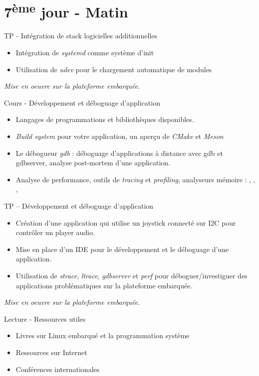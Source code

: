 \documentclass[a4paper,12pt,obeyspaces,spaces,hyphens]{article}
\begin{document}
\section{7\textsuperscript{ème} jour - Matin}

\feagendaonecolumn
{TP - Intégration de stack logicielles additionnelles}
{
  \begin{itemize}
  \item Intégration de {\em systemd} comme système d'init
  \item Utilisation de {\em udev} pour le chargement automatique de
    modules
  \end{itemize}

  \vspace{0.5cm}
  {\em Mise en oeuvre sur la plateforme embarquée.}
}

\feagendaonecolumn
{Cours - Développement et déboguage d'application}
{
  \begin{itemize}
  \item Langages de programmations et bibliothèques disponibles.
  \item {\em Build system} pour votre application, un aperçu de {\em
      CMake} et {\em Meson}
  \item Le débogueur {\em gdb} : déboguage d'applications à distance
    avec gdb et gdbserver, analyse post-mortem d'une application.
  \item Analyse de performance, outils de {\em tracing} et {\em
      profiling}, analyseurs mémoire : , ,
    , 
  \end{itemize}
}

\feagendaonecolumn
{TP – Développement et déboguage d'application}
{
  \begin{itemize}
  \item Création d'une application qui utilise un joystick connecté
    sur I2C pour contrôler un player audio.
  \item Mise en place d'un IDE pour le développement et le déboguage
    d'une application.
  \item Utilisation de {\em strace}, {\em ltrace}, {\em gdbserver} et
    {\em perf} pour déboguer/investiguer des applications
    problématiques sur la plateforme embarquée.
  \end{itemize}
  {\em Mise en oeuvre sur la plateforme embarquée.}
}

\feagendaonecolumn
{Lecture - Ressources utiles}
{
  \begin{itemize}
  \item Livres sur Linux embarqué et la programmation système
  \item Ressources sur Internet
  \item Conférences internationales
  \end{itemize}
}
\end{document}
